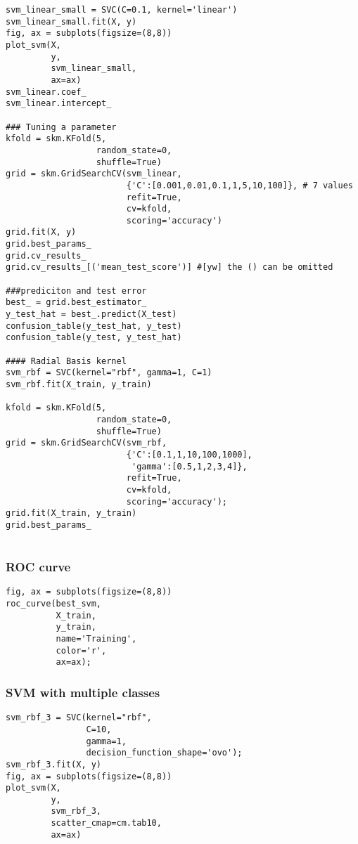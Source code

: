 \documentclass[
  letterpaper,
  DIV=11,
  numbers=noendperiod]{scrreprt}
\begin{document}
\begin{verbatim}
svm_linear_small = SVC(C=0.1, kernel='linear')
svm_linear_small.fit(X, y)
fig, ax = subplots(figsize=(8,8))
plot_svm(X,
         y,
         svm_linear_small,
         ax=ax)
svm_linear.coef_
svm_linear.intercept_

### Tuning a parameter
kfold = skm.KFold(5, 
                  random_state=0,
                  shuffle=True)
grid = skm.GridSearchCV(svm_linear,
                        {'C':[0.001,0.01,0.1,1,5,10,100]}, # 7 values
                        refit=True,
                        cv=kfold,
                        scoring='accuracy')
grid.fit(X, y)
grid.best_params_
grid.cv_results_
grid.cv_results_[('mean_test_score')] #[yw] the () can be omitted

###prediciton and test error
best_ = grid.best_estimator_
y_test_hat = best_.predict(X_test)
confusion_table(y_test_hat, y_test)
confusion_table(y_test, y_test_hat)

#### Radial Basis kernel
svm_rbf = SVC(kernel="rbf", gamma=1, C=1)
svm_rbf.fit(X_train, y_train)

kfold = skm.KFold(5, 
                  random_state=0,
                  shuffle=True)
grid = skm.GridSearchCV(svm_rbf,
                        {'C':[0.1,1,10,100,1000],
                         'gamma':[0.5,1,2,3,4]},
                        refit=True,
                        cv=kfold,
                        scoring='accuracy');
grid.fit(X_train, y_train)
grid.best_params_


\end{verbatim}

\subsubsection{ROC curve}\label{roc-curve}

\begin{verbatim}
fig, ax = subplots(figsize=(8,8))
roc_curve(best_svm,
          X_train,
          y_train,
          name='Training',
          color='r',
          ax=ax);
\end{verbatim}

\subsubsection{SVM with multiple
classes}\label{svm-with-multiple-classes}

\begin{verbatim}
svm_rbf_3 = SVC(kernel="rbf",
                C=10,
                gamma=1,
                decision_function_shape='ovo');
svm_rbf_3.fit(X, y)
fig, ax = subplots(figsize=(8,8))
plot_svm(X,
         y,
         svm_rbf_3,
         scatter_cmap=cm.tab10,
         ax=ax)
\end{verbatim}
\end{document}
